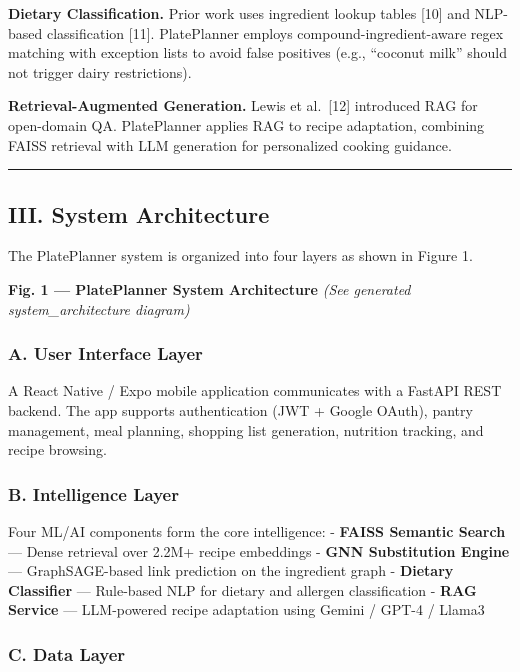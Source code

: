 \documentclass[10pt,conference,compsoc]{IEEEtran}
\begin{document}
\textbf{Dietary Classification.} Prior work uses ingredient lookup
tables {[}10{]} and NLP-based classification {[}11{]}. PlatePlanner
employs compound-ingredient-aware regex matching with exception lists to
avoid false positives (e.g., ``coconut milk'' should not trigger dairy
restrictions).

\textbf{Retrieval-Augmented Generation.} Lewis et al.~{[}12{]}
introduced RAG for open-domain QA. PlatePlanner applies RAG to recipe
adaptation, combining FAISS retrieval with LLM generation for
personalized cooking guidance.

\begin{center}\rule{0.5\linewidth}{0.5pt}\end{center}

\subsection{III. System Architecture}\label{iii.-system-architecture}

The PlatePlanner system is organized into four layers as shown in Figure
1.

\textbf{Fig. 1 --- PlatePlanner System Architecture} \emph{(See
generated system\_architecture diagram)}

\subsubsection{A. User Interface Layer}\label{a.-user-interface-layer}

A React Native / Expo mobile application communicates with a FastAPI
REST backend. The app supports authentication (JWT + Google OAuth),
pantry management, meal planning, shopping list generation, nutrition
tracking, and recipe browsing.

\subsubsection{B. Intelligence Layer}\label{b.-intelligence-layer}

Four ML/AI components form the core intelligence: - \textbf{FAISS
Semantic Search} --- Dense retrieval over 2.2M+ recipe embeddings -
\textbf{GNN Substitution Engine} --- GraphSAGE-based link prediction on
the ingredient graph - \textbf{Dietary Classifier} --- Rule-based NLP
for dietary and allergen classification - \textbf{RAG Service} ---
LLM-powered recipe adaptation using Gemini / GPT-4 / Llama3

\subsubsection{C. Data Layer}\label{c.-data-layer}
\end{document}
